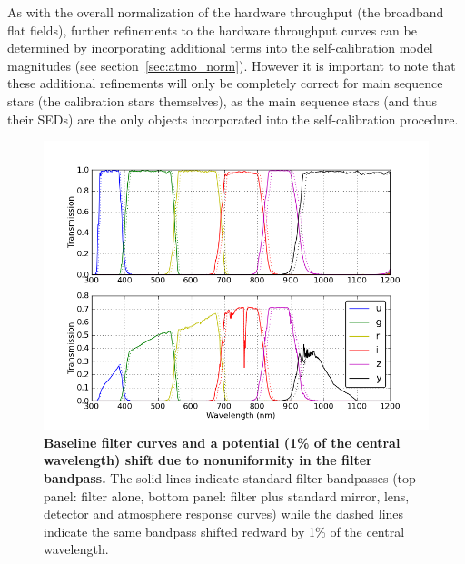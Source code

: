 \documentclass[12pt,preprint]{aastex}
\begin{document}
As with the overall normalization of the hardware throughput (the
broadband flat fields), further refinements to the hardware throughput
curves can be determined by incorporating additional terms into the
self-calibration model magnitudes (see section~\ref{sec:atmo_norm}).
However it is important to note that these additional refinements will
only be completely correct for main sequence stars (the calibration
stars themselves), as the main sequence stars (and thus their SEDs)
are the only objects incorporated into the self-calibration
procedure. 

\begin{figure}
\centering
\includegraphics[width=6in]{filter_shifts}
\caption{{\small 
{\bf Baseline filter curves and a potential (1\% of the central
  wavelength) shift due to nonuniformity in the filter bandpass.}
The solid lines indicate standard filter bandpasses (top panel: filter
alone, bottom panel: filter plus standard mirror, lens, detector and atmosphere
response curves) while the dashed lines indicate the same bandpass
shifted redward by 1\% of the central wavelength.}}
\label{fig:filtershift}
\end{figure}
\end{document}
